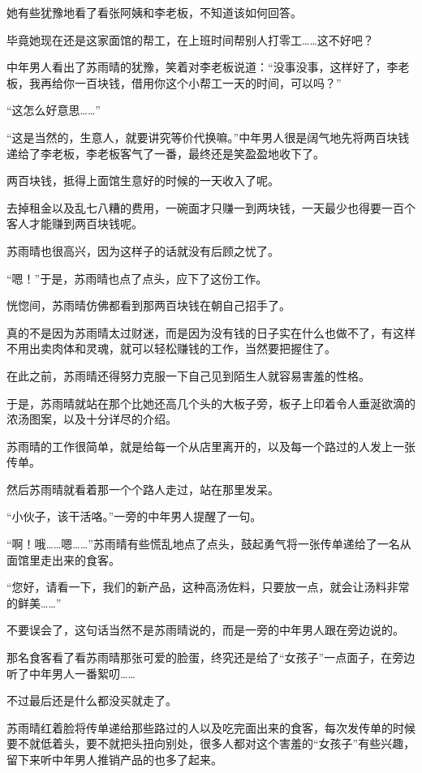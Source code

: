 她有些犹豫地看了看张阿姨和李老板，不知道该如何回答。

毕竟她现在还是这家面馆的帮工，在上班时间帮别人打零工……这不好吧？

中年男人看出了苏雨晴的犹豫，笑着对李老板说道：“没事没事，这样好了，李老板，我再给你一百块钱，借用你这个小帮工一天的时间，可以吗？”

“这怎么好意思……”

“这是当然的，生意人，就要讲究等价代换嘛。”中年男人很是阔气地先将两百块钱递给了李老板，李老板客气了一番，最终还是笑盈盈地收下了。

两百块钱，抵得上面馆生意好的时候的一天收入了呢。

去掉租金以及乱七八糟的费用，一碗面才只赚一到两块钱，一天最少也得要一百个客人才能赚到两百块钱呢。

苏雨晴也很高兴，因为这样子的话就没有后顾之忧了。

“嗯！”于是，苏雨晴也点了点头，应下了这份工作。

恍惚间，苏雨晴仿佛都看到那两百块钱在朝自己招手了。

真的不是因为苏雨晴太过财迷，而是因为没有钱的日子实在什么也做不了，有这样不用出卖肉体和灵魂，就可以轻松赚钱的工作，当然要把握住了。

在此之前，苏雨晴还得努力克服一下自己见到陌生人就容易害羞的性格。

于是，苏雨晴就站在那个比她还高几个头的大板子旁，板子上印着令人垂涎欲滴的浓汤图案，以及十分详尽的介绍。

苏雨晴的工作很简单，就是给每一个从店里离开的，以及每一个路过的人发上一张传单。

然后苏雨晴就看着那一个个路人走过，站在那里发呆。

“小伙子，该干活咯。”一旁的中年男人提醒了一句。

“啊！哦……嗯……”苏雨晴有些慌乱地点了点头，鼓起勇气将一张传单递给了一名从面馆里走出来的食客。

“您好，请看一下，我们的新产品，这种高汤佐料，只要放一点，就会让汤料非常的鲜美……”

不要误会了，这句话当然不是苏雨晴说的，而是一旁的中年男人跟在旁边说的。

那名食客看了看苏雨晴那张可爱的脸蛋，终究还是给了“女孩子”一点面子，在旁边听了中年男人一番絮叨……

不过最后还是什么都没买就走了。

苏雨晴红着脸将传单递给那些路过的人以及吃完面出来的食客，每次发传单的时候要不就低着头，要不就把头扭向别处，很多人都对这个害羞的“女孩子”有些兴趣，留下来听中年男人推销产品的也多了起来。

